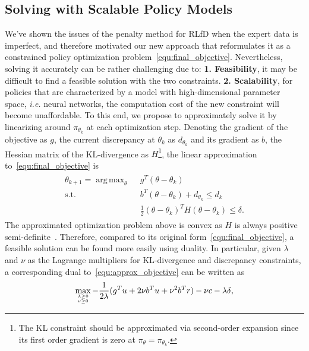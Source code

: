 \documentclass[letterpaper]{article} %
\DeclareMathOperator*{\argmax}{arg\,max}
\begin{document}
\subsection{Solving with Scalable Policy Models}
We've shown the issues of the penalty method for RLfD when the expert data is imperfect, and therefore motivated our new approach that reformulates it as a constrained policy optimization problem~\eqref{equ:final_objective}. Nevertheless, solving it accurately can be rather challenging due to: \textbf{1. Feasibility}, it may be difficult to find a feasible solution with the two constraints. \textbf{2. Scalability}, for policies that are characterized by a model with high-dimensional parameter space, \emph{i.e.} neural networks, the computation cost of the new constraint will become unaffordable. To this end, we propose to approximately solve it by linearizing around $\pi_{\theta_k}$ at each optimization step. Denoting the gradient of the objective as $g$, the current discrepancy at $\theta_k $ as $d_{\theta_k} $ and its gradient as $b$, the Hessian matrix of the KL-divergence as $H$\footnote{The KL constraint should be approximated via second-order expansion since its first order gradient is zero at $\pi_\theta = \pi_{\theta_k}$.}, the linear approximation to~\eqref{equ:final_objective} is
\begin{align}
\begin{split}\label{equ:approx_objective}
    \theta_{k+1} = \argmax_\theta~~& g^{T}(\theta - \theta_k)\\
    \text{s.t.}~~& b^T(\theta - \theta_k) + d_{\theta_k} \leqslant d_k \\
    & \frac{1}{2}(\theta-\theta_k)^TH(\theta-\theta_k) \leqslant \delta\text{.}
\end{split}    
\end{align}
The approximated optimization problem above is convex as $H$ is always positive semi-definite~\cite{trpo}. Therefore, compared to its original form~\eqref{equ:final_objective}, a feasible solution can be found more easily using duality. 
In particular, given $\lambda$ and $\nu$ as the Lagrange multipliers for KL-divergence and discrepancy constraints, a corresponding dual to~\eqref{equ:approx_objective} can be written as
\begin{align}
\begin{split}\label{equ:dual}
    \max_{\lambda \geq 0 \atop \nu \geq 0} -\frac{1}{2\lambda}(g^T u + 2\nu b^T u + \nu^2 b^T r) - \nu c - \lambda\delta\text{,}
\end{split}
\end{align}
\end{document}
